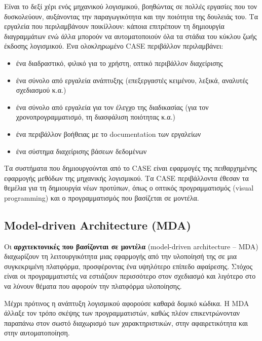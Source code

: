             Είναι το δεξί χέρι ενός μηχανικού λογισμικού, βοηθώντας σε πολλές εργασίες που τον δυσκολεύουν, αυξάνοντας την παραγωγικότητα και την ποιότητα της δουλειάς του. Τα εργαλεία που περιλαμβάνουν ποικίλλουν: κάποια επιτρέπουν τη δημιουργία διαγραμμάτων ενώ άλλα μπορούν να αυτοματοποιούν όλα τα στάδια του κύκλου ζωής έκδοσης λογισμικού. Ένα ολοκληρωμένο CASE περιβάλλον περιλαμβάνει:
            \vspace{-0.5em}
            \begin{itemize}[label={\tiny \blacksquare}]
                \setlength\itemsep{-0.25em}
                \item ένα διαδραστικό, φιλικό για το χρήστη, οπτικό περιβάλλον διαχείρισης
                \item ένα σύνολο από εργαλεία ανάπτυξης (επεξεργαστές κειμένου, λεξικά, αναλυτές σχεδιασμού κ.α.)
                \item ένα σύνολο από εργαλεία για τον έλεγχο της διαδικασίας (για τον χρονοπρογραμματισμό, τη διασφάλιση ποιότητας κ.α.)
                \item ένα περιβάλλον βοήθειας με το documentation των εργαλείων
                \item ένα σύστημα διαχείρισης βάσεων δεδομένων
            \end{itemize}
            \vspace{-0.5em}

            Τα συστήματα που δημιουργούνται από το CASE είναι εφαρμογές της πειθαρχημένης εφαρμογής μεθόδων της μηχανικής λογισμικού.
            Τα CASE περιβάλλοντα έθεσαν τα θεμέλια για τη δημιουργία νέων προτύπων, όπως ο οπτικός προγραμματισμός (visual programming) και ο προγραμματισμός που βασίζεται σε μοντέλα. \cite{CASEChikofsky, Case1985, CASEKuhn, AdoptionCASE}

        \subsection{Model-driven Architecture (MDA)}
            Οι \textbf{αρχιτεκτονικές που βασίζονται σε μοντέλα} (model-driven architecture -- MDA) διαχωρίζουν τη λειτουργικότητα μιας εφαρμογής από την υλοποίησή της σε μια συγκεκριμένη πλατφόρμα, προσφέροντας ένα υψηλότερο επίπεδο αφαίρεσης. Στόχος είναι οι προγραμματιστές να εστιάζουν περισσότερο στον σχεδιασμό και λιγότερο στο να λύνουν θέματα που αφορούν την πλατφόρμα υλοποίησης.

            Μέχρι πρότινος η ανάπτυξη λογισμικού αφορούσε καθαρά δομικό κώδικα. Η MDA άλλαξε τον τρόπο σκέψης των προγραμματιστών, καθώς πλέον επικεντρώνονταν παραπάνω στον σωστό διαχωρισμό των χαρακτηριστικών, στην αφαιρετικότητα και στην αυτοματοποίηση.
            \cite{Bucaioni2022, MDAFAQ, MDELow}

